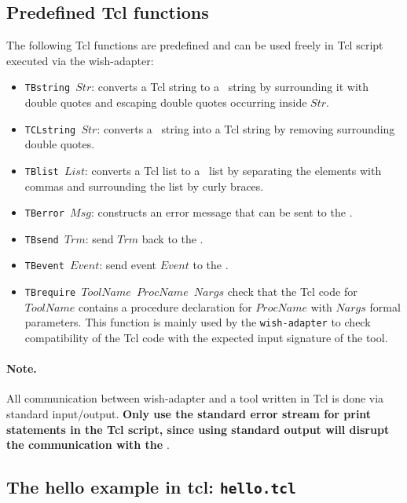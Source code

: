 \subsection{\label{Tcl-functions}Predefined Tcl functions}
The following Tcl functions are predefined and can be used freely in Tcl
script executed via the wish-adapter:
\begin{itemize}
\item {\tt TBstring $Str$\/}: converts a Tcl string to a \TB\ string by
surrounding it with double quotes and escaping double quotes occurring
inside $Str$.

\item {\tt TCLstring $Str$\/}: converts a \TB\ string into  a Tcl string
by removing surrounding double quotes.

\item {\tt TBlist $List$\/}: converts a Tcl list to a \TB\ list by
separating the elements with commas and surrounding the list by
curly braces.

\item {\tt TBerror $Msg$\/}: constructs an error message that can be sent
to the \TB.

\item {\tt TBsend $Trm$\/}: send $Trm$ back to the \TB.

\item {\tt TBevent $Event$\/}: send event $Event$ to the \TB.

\item {\tt TBrequire $ToolName$ $ProcName$ $Nargs$} check
that the Tcl code for $ToolName$ contains a procedure declaration
for $ProcName$ with $Nargs$ formal parameters.
This function is mainly used by the {\tt wish-adapter} to check
compatibility of the Tcl code with the expected input
signature of the tool.
\end{itemize}

\paragraph{Note.} All communication between wish-adapter and a
 tool written in Tcl is done via standard input/output. {\bf Only use
the standard error stream for print statements in the Tcl script,
since using standard output will disrupt the communication with the
\TB}.

\subsection{\label{Ex-hello.tcl}The hello example in tcl: {\tt hello.tcl}}


